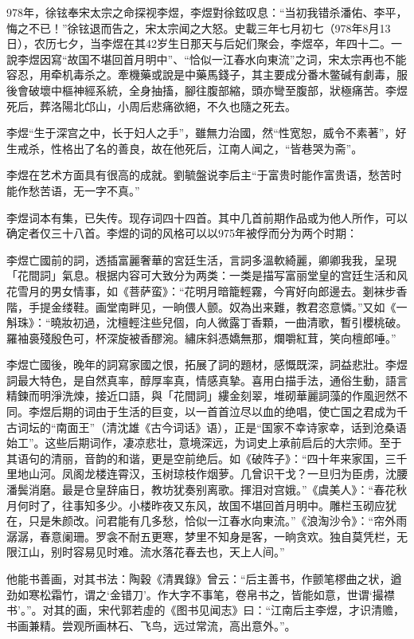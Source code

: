 978年，徐铉奉宋太宗之命探视李煜，李煜對徐鉉叹息：“当初我错杀潘佑、李平，悔之不已！”徐铉退而告之，宋太宗闻之大怒。史載三年七月初七（978年8月13日），农历七夕，当李煜在其42岁生日那天与后妃们聚会，李煜卒，年四十二。一說李煜因寫“故国不堪回首月明中”、“恰似一江春水向東流”之词，宋太宗再也不能容忍，用牵机毒杀之。牽機藥或說是中藥馬錢子，其主要成分番木鳖碱有劇毒，服後會破壞中樞神經系統，全身抽搐，腳往腹部縮，頭亦彎至腹部，狀極痛苦。李煜死后，葬洛陽北邙山，小周后悲痛欲絕，不久也隨之死去。

李煜“生于深宫之中，长于妇人之手”，雖無力治國，然“性宽恕，威令不素著”，好生戒杀，性格出了名的善良，故在他死后，江南人闻之，“皆巷哭为斋”。

李煜在艺术方面具有很高的成就。劉毓盤说李后主“于富贵时能作富贵语，愁苦时能作愁苦语，无一字不真。”

李煜词本有集，已失传。现存词四十四首。其中几首前期作品或为他人所作，可以确定者仅三十八首。李煜的词的风格可以以975年被俘而分为两个时期：


李煜亡國前的詞，透插富麗奢華的宮廷生活，言詞多溫軟綺麗，卿卿我我，呈現「花間詞」氣息。根据内容可大致分为两类：一类是描写富丽堂皇的宫廷生活和风花雪月的男女情事，如《菩萨蛮》：“花明月暗籠輕霧，今宵好向郎邊去。剗袜步香階，手提金缕鞋。画堂南畔见，一晌偎人颤。奴為出来難，教君恣意憐。”又如《一斛珠》：“曉妝初過，沈檀輕注些兒個，向人微露丁香顆，一曲清歌，暫引櫻桃破。羅袖裛殘殷色可，杯深旋被香醪涴。繡床斜憑嬌無那，爛嚼紅茸，笑向檀郎唾。”

李煜亡國後，晚年的詞寫家國之恨，拓展了詞的題材，感慨既深，詞益悲壯。李煜詞最大特色，是自然真率，醇厚率真，情感真摯。喜用白描手法，通俗生動，語言精鍊而明淨洗煉，接近口語，與「花間詞」縷金刻翠，堆砌華麗詞藻的作風迥然不同。李煜后期的词由于生活的巨变，以一首首泣尽以血的绝唱，使亡国之君成为千古词坛的“南面王”（清沈雄《古今词话》语），正是“国家不幸诗家幸，话到沧桑语始工”。这些后期词作，凄凉悲壮，意境深远，为词史上承前启后的大宗师。至于其语句的清丽，音韵的和谐，更是空前绝后。如《破阵子》：“四十年来家国，三千里地山河。凤阁龙楼连霄汉，玉树琼枝作烟萝。几曾识干戈？一旦归为臣虏，沈腰潘鬓消磨。最是仓皇辞庙日，教坊犹奏别离歌。揮泪对宫娥。”《虞美人》：“春花秋月何时了，往事知多少。小楼昨夜又东风，故国不堪回首月明中。雕栏玉砌应犹在，只是朱颜改。问君能有几多愁，恰似一江春水向東流。”《浪淘沙令》：“帘外雨潺潺，春意阑珊。罗衾不耐五更寒，梦里不知身是客，一晌贪欢。独自莫凭栏，无限江山，别时容易见时难。流水落花春去也，天上人间。”

他能书善画，对其书法：陶穀《清異錄》曾云：“后主善书，作颤笔樛曲之状，遒劲如寒松霜竹，谓之‘金错刀’。作大字不事笔，卷帛书之，皆能如意，世谓‘撮襟书’。”。对其的画，宋代郭若虛的《图书见闻志》曰：“江南后主李煜，才识清赡，书画兼精。尝观所画林石、飞鸟，远过常流，高出意外。”。

